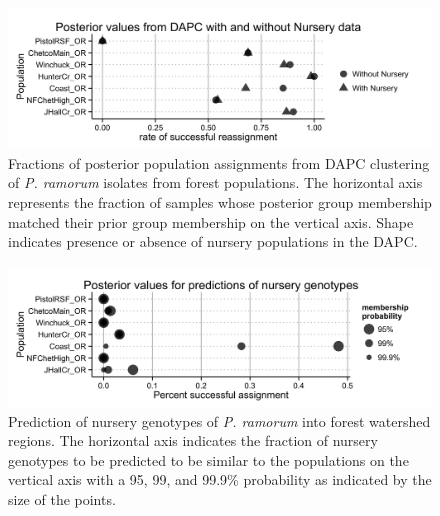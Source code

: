 \documentclass[double,11pt]{beavtex}
\begin{document}
  \begin{figure}
  
  {\centering \includegraphics[width=0.8\linewidth]{figure/phytopathology/figureS5} 
  
  }
  
  \caption[Fractions of posterior population assignments from DAPC clustering of
  \emph{P. ramorum} isolates from forest populations.]{Fractions of posterior population assignments from DAPC clustering of
  \emph{P. ramorum} isolates from forest populations. The horizontal axis
  represents the fraction of samples whose posterior group membership
  matched their prior group membership on the vertical axis. Shape
  indicates presence or absence of nursery populations in the DAPC.}\label{fig:ramS5}
  \end{figure}
  
  \begin{figure}
  
  {\centering \includegraphics[width=0.8\linewidth]{figure/phytopathology/figureS6} 
  
  }
  
  \caption[Prediction of nursery genotypes of \emph{P. ramorum} into forest
  watershed regions.]{Prediction of nursery genotypes of \emph{P. ramorum} into forest
  watershed regions. The horizontal axis indicates the fraction of nursery
  genotypes to be predicted to be similar to the populations on the
  vertical axis with a 95, 99, and 99.9\% probability as indicated by the
  size of the points.}\label{fig:ramS6}
  \end{figure}
  
\end{document}
